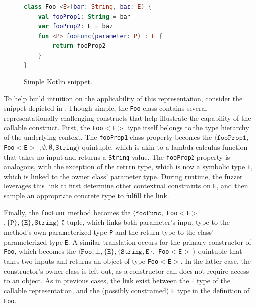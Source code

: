 \lstset{
  basicstyle=\footnotesize, frame=tb,
  xleftmargin=.2\textwidth, xrightmargin=.2\textwidth,
  numbers=left, stepnumber=1,
}

\begin{figure}
\begin{lstlisting}[language=Kotlin]
class Foo <E>(bar: String, baz: E) {
    val fooProp1: String = bar
    var fooProp2: E = baz
    fun <P> fooFunc(parameter: P) : E {
        return fooProp2
    }
}
\end{lstlisting}
\caption{Simple Kotlin snippet.}
\label{fig:callables}
\end{figure}

To help build intuition on the applicability of this representation,
consider the snippet depicted in .
Though simple, the \texttt{Foo} class contains several representationally
challenging constructs that help illustrate the capability of the callable construct.
First, the \texttt{Foo$<$E$>$} type itself belongs to the type hierarchy
of the underlying context. 
The \texttt{fooProp1} class property becomes the
$\langle \texttt{fooProp1},$ \texttt{Foo$<$\texttt{E}$>$} $, \emptyset, \emptyset, \texttt{String} \rangle$
quintuple, which is akin to a lambda-calculus function that takes no input and returns a \texttt{String} value.
The \texttt{fooProp2} property is analogous, with the exception of the return type,
which is now a symbolic type \texttt{E}, which is linked to the owner class' parameter type.
During runtime, the fuzzer leverages this link to first determine other contextual constraints
on \texttt{E}, and then sample an appropriate concrete type to fulfill the link.

Finally, the \texttt{fooFunc} method becomes the 
$\langle \texttt{fooFunc},$ \texttt{Foo$<$\texttt{E}$>$} $,
\{ \texttt{P} \}, \{ \texttt{E} \}, \texttt{String} \rangle$
5-tuple, which links both parameter's input type to the method's
own parameterized type \texttt{P} and the return type to the 
class' parameterized type \texttt{E}.
A similar translation occurs for the primary constructor of \texttt{Foo},
which becomes the 
$\langle \texttt{Foo}, \bot, \{ \texttt{E} \}, 
\{ \texttt{String}, \texttt{E} \},$ \texttt{Foo$<$\texttt{E}$>$} $\rangle$
quintuple that takes two inputs and returns an object of type \texttt{Foo$<$E$>$}.
In the latter case, the constructor's owner class is left out,
as a constructor call does not require access to an object.
As in previous cases, the link exist between the \texttt{E} type of 
the callable representation, and the (possibly constrained)
\texttt{E} type in the definition of \texttt{Foo}.

